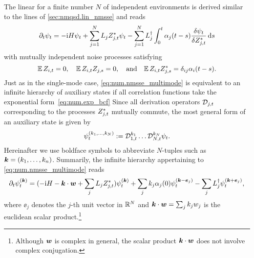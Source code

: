 The linear \NMSSE for a finite number $N$ of independent environments is derived similar to the lines of \autoref{sec:nmqsd.lin_nmsse} and reads
\begin{equation}
  \partial_t \psit = -\ii\Hsys\psit + \sum_{j=1}^N L_j \ZZ_{j, t} \psit - \sum_{j=1}^N \adj{L}_j \int_0^t \alpha_j(t - s) \frac{\delta \psit}{\delta \ZZ_{j, t}} \dd s
  \label{eq:num.nmsse_multimode}
\end{equation}
with mutually independent noise processes satisfying
\begin{equation*}
  \E\,Z_{i, t} = 0, \quad \E\,Z_{i, t} Z_{j, s} =0, \quad\mbox{and}\quad \E\,Z_{i, t} \ZZ_{j, s} = \delta_{ij}\alpha_i(t-s).
\end{equation*}
Just as in the single-mode case, \autoref{eq:num.nmsse_multimode} is equivalent to an infinite hierarchy of auxiliary states if all correlation functions take the exponential form~\ref{eq:num.exp_bcf}
Since all derivation operators $\mathcal{D}_{j, t}$ corresponding to the processes ${Z}^*_{j, t}$ mutually commute, the most general form of an auxiliary state is given by
\begin{equation}
  \psit[k_1, \dots, k_N] := \adjZZ_{1, t}^{k_1} \dots \adjZZ_{N, t}^{k_N} \psit.
  \label{eq:num.auxiliary_states_multi}
\end{equation}
Hereinafter we use boldface symbols to abbreviate $N$-tuples such as $\boldsymbol{k} = (k_1,\dots,k_n)$.
Summarily, the infinite hierarchy appertaining to \autoref{eq:num.nmsse_multimode} reads
\begin{equation}
  \partial_t\psit[\kk] = (-\ii\Hsys - \kk\cdot\ww + \sum_j L_j \ZZ_{j, t})\psit[\kk] + \sum_j k_j \alpha_j(0) \psit[\kk - \ee_j] - \sum_j \adj{L}_j \psit[\kk + \ee_j],
  \label{eq:num.hierarchy_lin_multi}
\end{equation}
where $\ee_j$ denotes the $j$-th unit vector in $\mathbb{R}^N$ and $\boldsymbol{k}\cdot\boldsymbol{w} = \sum_j k_jw_j$ is the euclidean scalar product.\footnote{%
  Although $\boldsymbol{w}$ is complex in general, the scalar product $\boldsymbol{k}\cdot\boldsymbol{w}$ does not involve complex conjugation.
}\\


